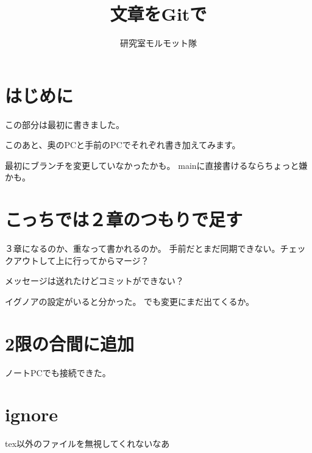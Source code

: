 \documentclass[a4j]{ujarticle}
\title{文章をGitで}
\author{研究室モルモット隊}
\begin{document}
\maketitle
\tableofcontents

\section{はじめに}
この部分は最初に書きました。

このあと、奥のPCと手前のPCでそれぞれ書き加えてみます。

最初にブランチを変更していなかったかも。
mainに直接書けるならちょっと嫌かも。

\section{こっちでは２章のつもりで足す}
３章になるのか、重なって書かれるのか。
手前だとまだ同期できない。チェックアウトして上に行ってからマージ？

メッセージは送れたけどコミットができない？

イグノアの設定がいると分かった。
でも変更にまだ出てくるか。

\section{2限の合間に追加}
ノートPCでも接続できた。

\section{ignore}
tex以外のファイルを無視してくれないなあ
\end{document}
